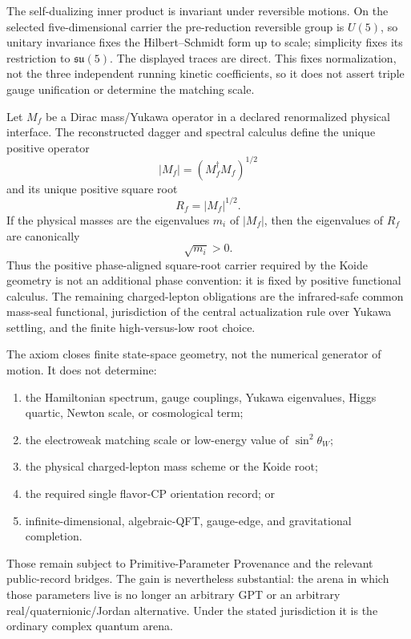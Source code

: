 \begin{proofsketch}
The self-dualizing inner product is invariant under reversible motions.  On the
selected five-dimensional carrier the pre-reduction reversible group is $U(5)$, so
unitary invariance fixes the Hilbert--Schmidt form up to scale; simplicity fixes its
restriction to $\mathfrak{su}(5)$.  The displayed traces are direct.  This fixes
normalization, not the three independent running kinetic coefficients, so it does
not assert triple gauge unification or determine the matching scale.
\end{proofsketch}

\begin{proposition}
\label{prop:rd-positive-mass-carrier}
Let $M_f$ be a Dirac mass/Yukawa operator in a declared renormalized physical
interface.  The reconstructed dagger and spectral calculus define the unique
positive operator
\[
 |M_f|=(M_f^\dagger M_f)^{1/2}
\]
and its unique positive square root
\[
 R_f=|M_f|^{1/2}.
\]
If the physical masses are the eigenvalues $m_i$ of $|M_f|$, then the eigenvalues of
$R_f$ are canonically
\[
 \sqrt{m_i}>0.
\]
Thus the positive phase-aligned square-root carrier required by the Koide geometry is
not an additional phase convention: it is fixed by positive functional calculus.
The remaining charged-lepton obligations are the infrared-safe common mass-seal
functional, jurisdiction of the central actualization rule over Yukawa settling,
and the finite high-versus-low root choice.
\end{proposition}

\begin{remark}
The axiom closes finite state-space geometry, not the numerical generator of motion.
It does not determine:
\begin{enumerate}[label=\textup{(\roman*)},leftmargin=2.2em]
\item the Hamiltonian spectrum, gauge couplings, Yukawa eigenvalues, Higgs quartic,
      Newton scale, or cosmological term;
\item the electroweak matching scale or low-energy value of $\sin^2\theta_W$;
\item the physical charged-lepton mass scheme or the Koide root;
\item the required single flavor-CP orientation record; or
\item infinite-dimensional, algebraic-QFT, gauge-edge, and gravitational completion.
\end{enumerate}
Those remain subject to Primitive-Parameter Provenance and the relevant public-record
bridges.  The gain is nevertheless substantial: the arena in which those parameters
live is no longer an arbitrary GPT or an arbitrary real/quaternionic/Jordan
alternative.  Under the stated jurisdiction it is the ordinary complex quantum
arena.
\end{remark}

